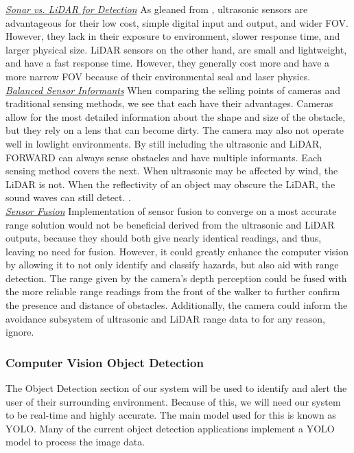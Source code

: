 \noindent \underline{\textit{Sonar vs. LiDAR for Detection}} As gleaned from \cite{sonar-vs-lidar}, ultrasonic sensors are advantageous for their low cost, simple digital input and output, and wider FOV. However, they lack in their exposure to environment, slower response time, and larger physical size. LiDAR sensors on the other hand, are small and lightweight, and have a fast response time. However, they generally cost more and have a more narrow FOV because of their environmental seal and laser physics.\\

\noindent \underline{\textit{Balanced Sensor Informants}} When comparing the selling points of cameras and traditional sensing methods, we see that each have their advantages. Cameras allow for the most detailed information about the shape and size of the obstacle, but they rely on a lens that can become dirty. The camera may also not operate well in lowlight environments. By still including the ultrasonic and LiDAR, FORWARD can always sense obstacles and have multiple informants. Each sensing method covers the next. When ultrasonic may be affected by wind, the LiDAR is not. When the reflectivity of an object may obscure the LiDAR, the sound waves can still detect. \cite{camera-vs-sensor}.\\

\noindent \underline{\textit{Sensor Fusion}} Implementation of sensor fusion to converge on a most accurate range solution would not be beneficial derived from the ultrasonic and LiDAR outputs, because they should both give nearly identical readings, and thus, leaving no need for fusion. However, it could greatly enhance the computer vision by allowing it to not only identify and classify hazards, but also aid with range detection. The range given by the camera's depth perception could be fused with the more reliable range readings from the front of the walker to further confirm the presence and distance of obstacles. Additionally, the camera could inform the avoidance subsystem of ultrasonic and LiDAR range data to for any reason, ignore.\\

\subsubsection{Computer Vision Object Detection}
\noindent The Object Detection section of our system will be used to identify and alert the user of their surrounding environment. Because of this, we will need our system to be real-time and highly accurate. The main model used for this is known as YOLO. Many of the current object detection applications implement a YOLO model to process the image data. \\


